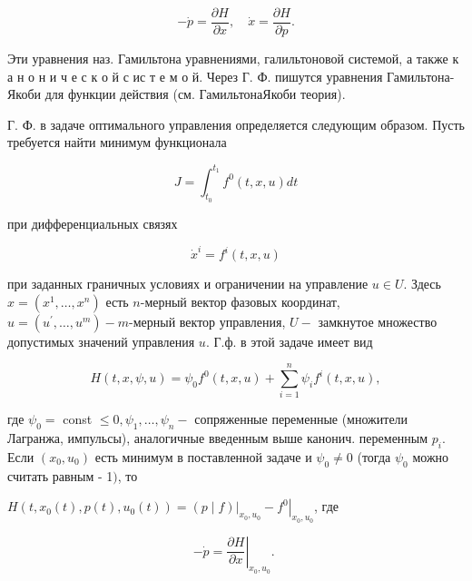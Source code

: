 \documentclass[10pt]{article}
\begin{document}
\[

-\dot{p}=\frac{\partial H}{\partial x}, \quad \dot{x}=\frac{\partial H}{\partial p} .

\]



Эти уравнения наз. Гамильтона уравнениями, галильтоновой системой, а также к а н о н и ч е с к о й с ис т е м о й. Через Г. Ф. пишутся уравнения Гамильтона-Якоби для функции действия (см. ГамильтонаЯкоби теория).



Г. Ф. в задаче оптимального управления определяется следующим образом. Пусть требуется найти минимум функционала



\[

J=\int_{t_{0}}^{t_{1}} f^{0}(t, x, u) d t

\]



при дифференциальных связях



\[

\dot{x}^{i}=f^{i}(t, x, u)

\]



при заданных граничных условиях и ограничении на управление $u \in U$. Здесь $x=\left(x^{1}, \ldots, x^{n}\right)$ есть $n$-мерный вектор фазовых координат, $u=\left(u^{\prime}, \ldots, u^{m}\right)-m$-мерный вектор управления, $U-$ замкнутое множество допустимых значений управления $u$. Г.ф. в этой задаче имеет вид



\[

H(t, x, \psi, u)=\psi_{0} f^{0}(t, x, u)+\sum_{i=1}^{n} \psi_{i} f^{i}(t, x, u),

\]



где $\psi_{0}=$ const $\leqslant 0, \psi_{1}, \ldots, \psi_{n}-$ сопряженные переменные (множители Лагранжа, импульсы), аналогичные введенным выше канонич. переменным $p_{i}$. Если $\left(x_{0}, u_{0}\right)$ есть минимум в поставленной задаче и $\psi_{0} \neq 0$ (тогда $\psi_{0}$ можно считать равным - 1$)$, то



$H\left(t, x_{0}(t), p(t), u_{0}(t)\right)=\left.(p \mid f)\right|_{x_{0}, u_{0}}-\left.f^{0}\right|_{x_{0}, u_{0}}$, где



\[

-\dot{p}=\left.\frac{\partial H}{\partial x}\right|_{x_{0}, u_{0}} \text {. }

\]
\end{document}

